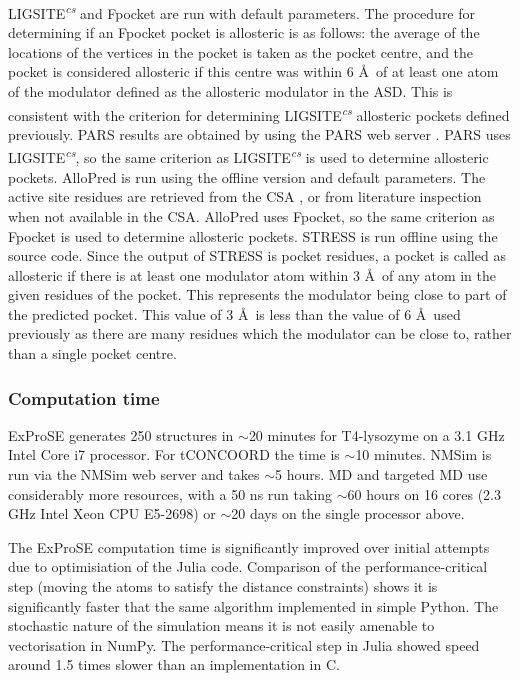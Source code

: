 LIGSITE\textsuperscript{\it cs} \cite{Huang2006} and Fpocket \cite{LeGuilloux2009} are run with default parameters.
The procedure for determining if an Fpocket pocket is allosteric is as follows: the average of the locations of the vertices in the pocket is taken as the pocket centre, and the pocket is considered allosteric if this centre was within 6 \AA\ of at least one atom of the modulator defined as the allosteric modulator in the ASD.
This is consistent with the criterion for determining LIGSITE\textsuperscript{\it cs} allosteric pockets defined previously.
PARS results are obtained by using the PARS web server \cite{Panjkovich2014}.
PARS uses LIGSITE\textsuperscript{\it cs}, so the same criterion as LIGSITE\textsuperscript{\it cs} is used to determine allosteric pockets.
AlloPred is run using the offline version and default parameters.
The active site residues are retrieved from the CSA \cite{Furnham2014}, or from literature inspection when not available in the CSA.
AlloPred uses Fpocket, so the same criterion as Fpocket is used to determine allosteric pockets.
STRESS \cite{Clarke2016} is run offline using the source code.
Since the output of STRESS is pocket residues, a pocket is called as allosteric if there is at least one modulator atom within 3 \AA\ of any atom in the given residues of the pocket.
This represents the modulator being close to part of the predicted pocket.
This value of 3 \AA\ is less than the value of 6 \AA\ used previously as there are many residues which the modulator can be close to, rather than a single pocket centre.


\subsubsection{Computation time}

ExProSE generates 250 structures in $\sim$20 minutes for T4-lysozyme on a 3.1 GHz Intel Core i7 processor.
For tCONCOORD the time is $\sim$10 minutes.
NMSim is run via the NMSim web server and takes $\sim$5 hours.
MD and targeted MD use considerably more resources, with a 50 ns run taking $\sim$60 hours on 16 cores (2.3 GHz Intel Xeon CPU E5-2698) or $\sim$20 days on the single processor above.

The ExProSE computation time is significantly improved over initial attempts due to optimisiation of the Julia code.
Comparison of the performance-critical step (moving the atoms to satisfy the distance constraints) shows it is significantly faster that the same algorithm implemented in simple Python.
The stochastic nature of the simulation means it is not easily amenable to vectorisation in NumPy.
The performance-critical step in Julia showed speed around 1.5 times slower than an implementation in C.


